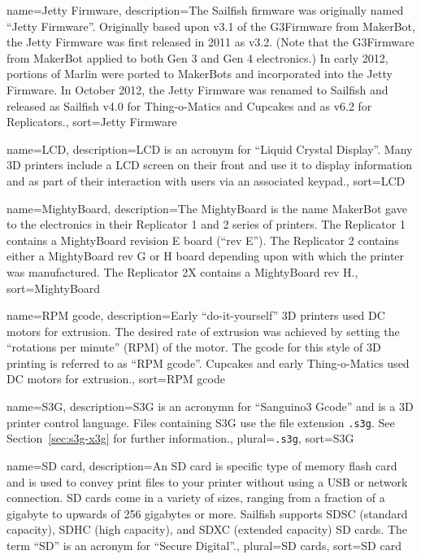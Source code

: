 {
        name={Jetty Firmware},
        description={The Sailfish firmware was originally named
``Jetty Firmware''. Originally based upon v3.1 of the G3Firmware from
MakerBot, the Jetty Firmware was first released in 2011 as v3.2.  (Note that
the G3Firmware from MakerBot applied to both Gen 3 and Gen 4 electronics.)
In early 2012, portions of Marlin were ported to MakerBots and incorporated
into the Jetty Firmware.  In October 2012, the Jetty Firmware was
renamed to Sailfish and released as Sailfish v4.0 for Thing-o-Matics and
Cupcakes and as v6.2 for Replicators.},
        sort=Jetty Firmware
}

{
        name={LCD},
        description={LCD is an acronym for ``Liquid Crystal Display''.  Many
3D printers include a LCD screen on their front and use it to display
information and as part of their interaction with users via an associated
keypad.},
        sort=LCD
}

{
        name={MightyBoard},
        description={The MightyBoard is the name MakerBot gave to the
electronics in their Replicator 1 and 2 series of printers.  The Replicator 1
contains a MightyBoard revision E board (``rev E'').  The Replicator 2 contains
either a MightyBoard rev G or H board depending upon with which the printer was
manufactured.  The Replicator 2X contains a MightyBoard rev H.},
         sort=MightyBoard
}

{
        name={RPM gcode},
        description={Early ``do-it-yourself'' 3D printers used DC
motors for extrusion.  The desired rate of extrusion was achieved by
setting the ``rotations per minute'' (RPM) of the motor.  The gcode
for this style of 3D printing is referred to as ``RPM gcode''.  Cupcakes
and early Thing-o-Matics used DC motors for extrusion.},
        sort=RPM gcode
}

{
        name={S3G},
        description={S3G is an acronymn for ``Sanguino3 Gcode'' and is a
3D printer control language.  Files containing S3G use the file extension
\texttt{.s3g}.  See Section~\ref{sec:s3g-x3g} for further information.},
        plural={\texttt{.s3g}},
        sort=S3G
}

{
        name={SD card},
        description={An SD card is specific type of memory flash card and is
used to convey print files to your printer without using a USB or network
connection.  SD cards come in a variety of sizes, ranging from a fraction of
a gigabyte to upwards of 256 gigabytes or more.   Sailfish supports SDSC
(standard capacity), SDHC (high capacity), and SDXC (extended capacity) SD
cards.  The term ``SD'' is an acronym for ``Secure Digital''.},
        plural={SD cards},
        sort=SD card
}

